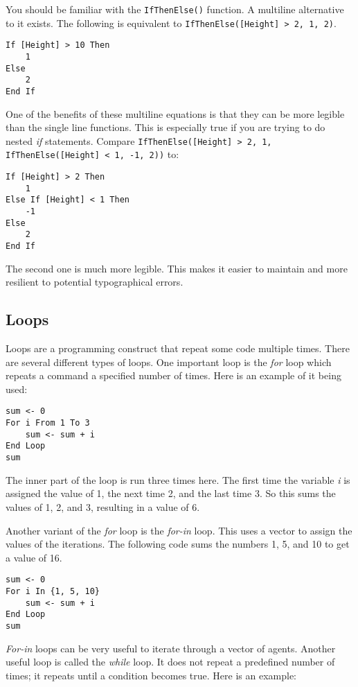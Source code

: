 \documentclass[]{memoir}
\begin{document}
You should be familiar with the \lstinline!IfThenElse()! function. A
multiline alternative to it exists. The following is equivalent to
\lstinline!IfThenElse([Height] > 2, 1, 2)!.

\begin{lstlisting}
If [Height] > 10 Then
    1
Else
    2
End If
\end{lstlisting}

One of the benefits of these multiline equations is that they can be
more legible than the single line functions. This is especially true if
you are trying to do nested \emph{if} statements. Compare
\lstinline!IfThenElse([Height] > 2, 1, IfThenElse([Height] < 1, -1, 2))!
to:

\begin{lstlisting}
If [Height] > 2 Then
    1
Else If [Height] < 1 Then
    -1
Else
    2
End If
\end{lstlisting}

The second one is much more legible. This makes it easier to maintain
and more resilient to potential typographical errors.

\subsection{Loops}

Loops are a programming construct that repeat some code multiple times.
There are several different types of loops. One important loop is the
\emph{for} loop which repeats a command a specified number of times.
Here is an example of it being used:

\begin{lstlisting}
sum <- 0
For i From 1 To 3
    sum <- sum + i
End Loop
sum
\end{lstlisting}

The inner part of the loop is run three times here. The first time the
variable \emph{i} is assigned the value of 1, the next time 2, and the
last time 3. So this sums the values of 1, 2, and 3, resulting in a
value of 6.

Another variant of the \emph{for} loop is the \emph{for-in} loop. This
uses a vector to assign the values of the iterations. The following code
sums the numbers 1, 5, and 10 to get a value of 16.

\begin{lstlisting}
sum <- 0
For i In {1, 5, 10}
    sum <- sum + i
End Loop
sum
\end{lstlisting}

\emph{For-in} loops can be very useful to iterate through a vector of
agents. Another useful loop is called the \emph{while} loop. It does not
repeat a predefined number of times; it repeats until a condition
becomes true. Here is an example:
\end{document}
